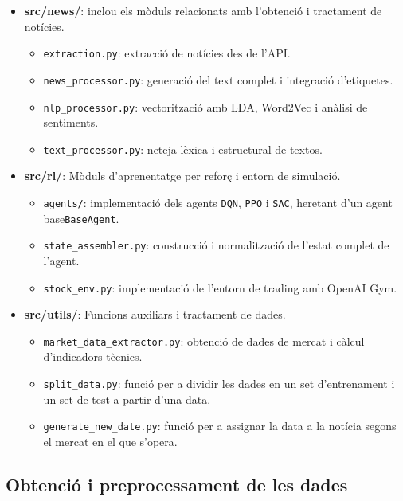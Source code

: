 \documentclass[12pt,a4paper,twoside]{book}
\begin{document}
\begin{itemize}
    \item \textbf{src/news/}: inclou els mòduls relacionats amb l'obtenció i tractament de notícies.
    \begin{itemize}
        \item \texttt{extraction.py}: extracció de notícies des de l'API.
        \item \texttt{news\_processor.py}: generació del text complet i integració d'etiquetes.
        \item \texttt{nlp\_processor.py}: vectorització amb LDA, Word2Vec i anàlisi de sentiments.
        \item \texttt{text\_processor.py}: neteja lèxica i estructural de textos.
    \end{itemize}

    \item \textbf{src/rl/}: Mòduls d'aprenentatge per reforç i entorn de simulació.
    \begin{itemize}
        \item \texttt{agents/}: implementació dels agents \texttt{DQN}, \texttt{PPO} i \texttt{SAC}, heretant d'un agent base\texttt{BaseAgent}.
        \item \texttt{state\_assembler.py}: construcció i normalització de l'estat complet de l'agent.
        \item \texttt{stock\_env.py}: implementació de l'entorn de trading amb OpenAI Gym.
    \end{itemize}

    \item \textbf{src/utils/}: Funcions auxiliars i tractament de dades.
    \begin{itemize}
        \item \texttt{market\_data\_extractor.py}: obtenció de dades de mercat i càlcul d'indicadors tècnics.
        \item \texttt{split\_data.py}: funció per a dividir les dades en un set d'entrenament i un set de test a partir d'una data.
        \item \texttt{generate\_new\_date.py}: funció per a assignar la data a la notícia segons el mercat en el que s'opera.
    \end{itemize}
\end{itemize}

\subsection{Obtenció i preprocessament de les dades}
\end{document}
